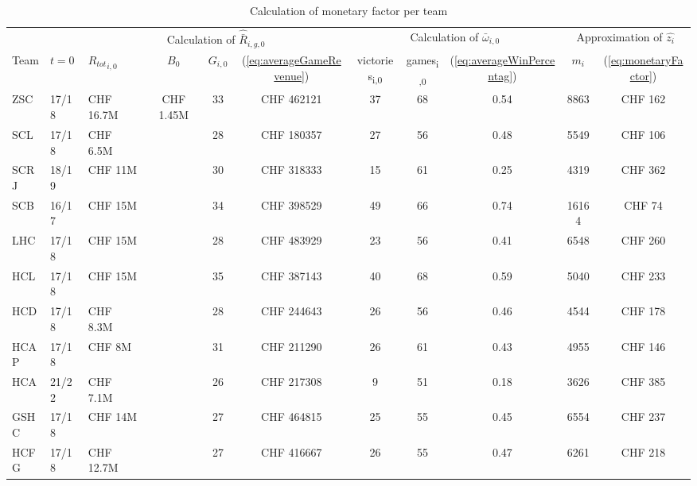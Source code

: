 \begin{landscape}
\begin{table}[!ht]
\vspace{1.5cm}
\centering
    \begin{threeparttable}
        \renewcommand{\arraystretch}{1.1}
        \caption{Calculation of monetary factor per team}
        \label{table:calcMonetaryFactor}
        \begin{tabular}{lllcccccccc}
            \toprule
            \multicolumn{2}{c}{}&\multicolumn{4}{c}{Calculation of ${\hat{\bar{R}}_{i,g,0}}$}&\multicolumn{3}{c}{Calculation of ${\bar{\omega}_{i,0}}$} & \multicolumn{2}{c}{Approximation of $\hat{z_i}$} \\
            \cmidrule(lr){3-6} \cmidrule(lr){7-9} \cmidrule(lr){10-11}
            Team & $t=0$ & ${R_{tot}}_{i,0}$ & $B_0$ & $G_{i,0}$ & (\ref{eq:averageGameRevenue})\tnote{1} & victories\textsubscript{i,0} & games\textsubscript{i,0} & (\ref{eq:averageWinPercentag})\tnote{1} & $m_i$ & (\ref{eq:monetaryFactor})\tnote{1} \\ 
            \midrule
            ZSC & 17/18 & CHF 16.7M & \multirow[c]{14}{*}{CHF 1.45M} & 33 & CHF 462121 & 37 & 68 & 0.54 & 8863 & CHF 162 \\
            SCL & 17/18 & CHF 6.5M &  & 28 & CHF 180357 & 27 &  56 & 0.48 & 5549 & CHF 106 \\
            SCRJ & 18/19 & CHF 11M &  & 30 & CHF 318333 & 15 & 61 & 0.25 & 4319 & CHF 362 \\
            SCB & 16/17\tnote{2} & CHF 15M &  & 34 & CHF 398529 & 49 & 66 & 0.74 & 16164 & CHF 74 \\ 
            LHC & 17/18 & CHF 15M &  & 28 & CHF 483929 & 23 & 56 & 0.41 & 6548 & CHF 260 \\ 
            HCL & 17/18 & CHF 15M &  & 35 & CHF 387143 & 40 & 68 & 0.59 & 5040 & CHF 233 \\ 
            HCD & 17/18 & CHF 8.3M &  & 28 & CHF 244643 & 26 & 56 & 0.46 & 4544 & CHF 178 \\
            HCAP & 17/18 & CHF 8M &  & 31 & CHF 211290 & 26 & 61 & 0.43 & 4955 & CHF 146 \\ 
            HCA & 21/22\tnote{3} & CHF 7.1M &  & 26 & CHF 217308 & 9 & 51 & 0.18 & 3626 & CHF 385 \\ 
            GSHC & 17/18 & CHF 14M &  & 27 & CHF 464815 & 25 & 55 & 0.45 & 6554 & CHF 237 \\ 
            HCFG & 17/18 & CHF 12.7M &  & 27 & CHF 416667 & 26 & 55 & 0.47 & 6261 & CHF 218 \\

\end{tabular}
\end{threeparttable}
\end{table}
\end{landscape}
